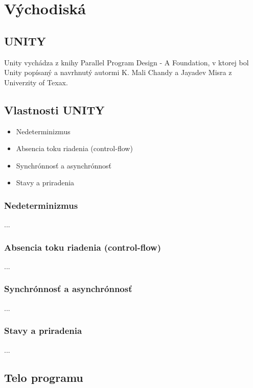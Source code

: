 
\chapter{Východiská}\label{chap:intro}

\section{UNITY}

Unity vychádza z knihy Parallel Program Design - A Foundation, v ktorej bol Unity popísaný a navrhnutý autormi K. Mali Chandy a Jayadev Misra z Univerzity of Texax.



\section{Vlastnosti UNITY}

\begin{itemize}
\item Nedeterminizmus
\item Absencia toku riadenia (control-flow)
\item Synchrónnosť a asynchrónnosť
\item Stavy a priradenia
\end{itemize}


\subsection{Nedeterminizmus}
...

\subsection{Absencia toku riadenia (control-flow)}
...

\subsection{Synchrónnosť a asynchrónnosť}
...

\subsection{Stavy a priradenia}
...

\section{Telo programu}

